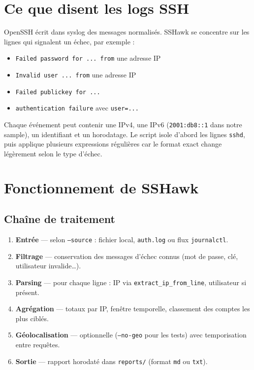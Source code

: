 \documentclass[11pt,a4paper]{article}
\newcommand{\NewSectionPage}{\clearpage}
\begin{document}
\NewSectionPage
\section{Ce que disent les logs SSH}

OpenSSH écrit dans syslog des messages normalisés. SSHawk se concentre sur les lignes qui signalent un échec,
par exemple :

\begin{itemize}[leftmargin=*]
  \item \texttt{Failed password for ... from} une adresse IP
  \item \texttt{Invalid user ... from} une adresse IP
  \item \texttt{Failed publickey for ...}
  \item \texttt{authentication failure} avec \texttt{user=...}
\end{itemize}

Chaque événement peut contenir une IPv4, une IPv6 (\texttt{2001:db8::1} dans notre sample), un identifiant
et un horodatage. Le script isole d'abord les lignes \texttt{sshd}, puis applique plusieurs expressions régulières
car le format exact change légèrement selon le type d'échec.

\section{Fonctionnement de SSHawk}

\subsection{Chaîne de traitement}

\begin{enumerate}[leftmargin=*]
  \item \textbf{Entrée} — selon \texttt{--source} : fichier local, \texttt{auth.log} ou flux \texttt{journalctl}.
  \item \textbf{Filtrage} — conservation des messages d'échec connus (mot de passe, clé, utilisateur invalide\ldots).
  \item \textbf{Parsing} — pour chaque ligne : IP via \texttt{extract\_ip\_from\_line}, utilisateur si présent.
  \item \textbf{Agrégation} — totaux par IP, fenêtre temporelle, classement des comptes les plus ciblés.
  \item \textbf{Géolocalisation} — optionnelle (\texttt{--no-geo} pour les tests) avec temporisation entre requêtes.
  \item \textbf{Sortie} — rapport horodaté dans \texttt{reports/} (format \texttt{md} ou \texttt{txt}).
\end{enumerate}
\end{document}
